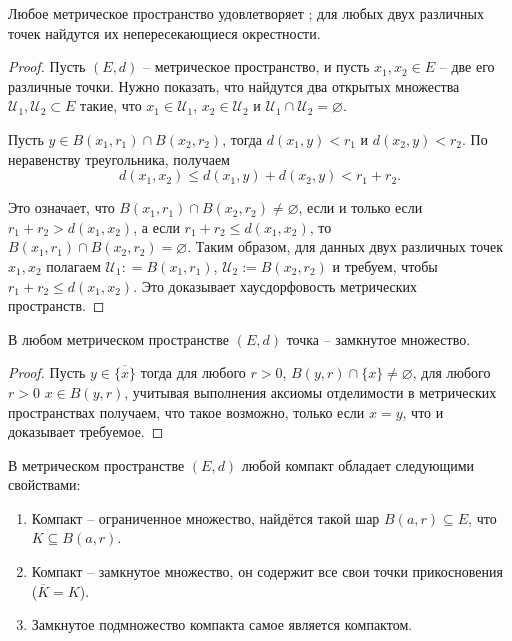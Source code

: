 \begin{lemma}\label{metric=hausdorff}
    Любое метрическое пространство удовлетворяет ; для любых двух различных точек найдутся их непересекающиеся окрестности.
\end{lemma}
\begin{proof}
    Пусть $(E,d)$ -- метрическое пространство, и пусть $x_1,x_2 \in E$ -- две его различные точки. Нужно показать, что найдутся два открытых множества $\mathscr{U}_1, \mathscr{U}_2 \subset E$ такие, что $x_1\in \mathscr{U}_1$, $x_2\in \mathscr{U}_2$ и $\mathscr{U}_1\cap \mathscr{U}_2 = \varnothing.$

   Пусть $y \in B(x_1,r_1) \cap B(x_2,r_2)$, тогда $d(x_1,y)<r_1$ и $d(x_2,y)<r_2$. По неравенству треугольника, получаем
    \[
     d(x_1,x_2) \le d(x_1,y) + d(x_2,y)< r_1 +r_2.
    \]

    Это означает, что $B(x_1,r_1) \cap B(x_2,r_2) \ne \varnothing$, если и только если $r_1+r_2 > d(x_1,x_2)$, а если $r_1+r_2 \le d(x_1,x_2)$, то $B(x_1,r_1) \cap B(x_2,r_2) = \varnothing$. Таким образом, для данных двух различных точек $x_1,x_2$ полагаем $\mathscr{U}_1: = B(x_1,r_1)$, $\mathscr{U}_2:=B(x_2,r_2)$ и требуем, чтобы $r_1+r_2 \le d(x_1,x_2)$. Это доказывает хаусдорфовость метрических пространств. 
\end{proof}

\begin{corollary}\label{point_is_closed}
    В любом метрическом пространстве $(E,d)$ точка -- замкнутое множество.
\end{corollary}

\begin{proof}
    Пусть $y \in \overline{\{x\}}$ тогда для любого $r>0$, $B(y,r) \cap \{x\} \ne \varnothing$, \ie для любого $r >0$ $x \in B(y,r)$, учитывая выполнения аксиомы отделимости в метрических пространствах получаем, что такое возможно, только если $x =y$, что и доказывает требуемое.
\end{proof}


\begin{theorem}\label{properties_of_compact}
 В метрическом пространстве $(E,d)$ любой компакт обладает следующими свойствами:
  \begin{enumerate}
      \item Компакт -- ограниченное множество, \ie найдётся такой шар $B(a,r) \subseteq E$, что $K \subseteq B(a,r)$.
      \item Компакт -- замкнутое множество, \ie он содержит все свои точки прикосновения ($\overline{K} = K$).
      \item Замкнутое подмножество компакта самое является компактом.
  \end{enumerate} 
\end{theorem}

